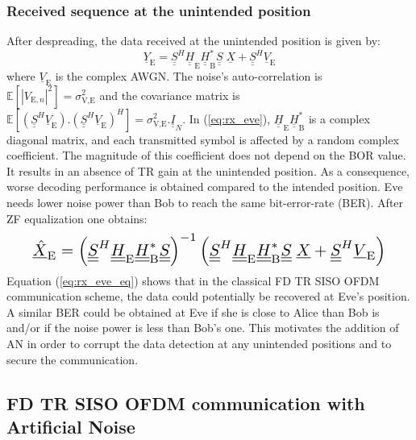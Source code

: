 \documentclass[a4paper,11pt]{article}
\def\uu#1{\underline{\underline{#1}}}
\begin{document}
\subsubsection{Received sequence at the unintended position}
After despreading, the data received at the unintended position is given by:
\begin{equation}
    \underline{Y}_{\text{E}}= \underline{\underline{S}}^H  \underline{\underline{H}}_{\text{E}} \underline{\underline{H}}^*_{\text{B}}  \underline{\underline{S}}\; \underline{X}  +  \underline{\underline{S}}^H  \underline{V}_\text{E}
    \label{eq:rx_eve}
\end{equation}
where $\underline{V}_\text{E}$ is the complex AWGN. The noise's auto-correlation is $\mathbb{E}[ \left|V_{\text{E},n}\right|^2 ] = \sigma_{\text{V,E}}^2$ and the covariance matrix is $\mathbb{E}[(\uu{S}^H  \underline{V}_\text{E}) . (\uu{S}^H \underline{V}_\text{E})^H ] = \sigma_{\text{V,E}}^2 . \uu{I}_N$.  In (\ref{eq:rx_eve}), $\underline{\underline{H}}_{\text{E}} \underline{\underline{H}}^*_{\text{B}}$ is a complex diagonal matrix, and each transmitted symbol is affected by a random complex coefficient. The magnitude of this coefficient does not depend on the BOR value. It results in an absence of TR gain at the unintended position. As a consequence, worse decoding performance is obtained compared to the intended position. Eve needs lower noise power than Bob to reach the same bit-error-rate (BER). After ZF equalization one obtains:
\begin{equation}\resizebox{0.91\hsize}{!}{$
    \underline{\hat{X}}_{\text{E}} = \left(\underline{\underline{S}}^H  \underline{\underline{H}}_{\text{E}} \underline{\underline{H}}^*_{\text{B}}\underline{\underline{S}}\right)^{-1} \left(\underline{\underline{S}}^H  \underline{\underline{H}}_{\text{E}} \underline{\underline{H}}^*_{\text{B}}\underline{\underline{S}}\; \underline{X} +  \underline{\underline{S}}^H \underline{V}_\text{E}\right)$}
    \label{eq:rx_eve_eq}
\end{equation}
Equation (\ref{eq:rx_eve_eq}) shows that in the classical FD TR SISO OFDM communication scheme, the data could potentially be recovered at Eve's position. A similar BER could be obtained at Eve if she is close to Alice than Bob is and/or if the noise power is less than Bob's one. This motivates the addition of AN in order to corrupt the data detection at any unintended positions and to secure the communication. 


\subsection{FD TR SISO OFDM communication with Artificial Noise}
\end{document}
